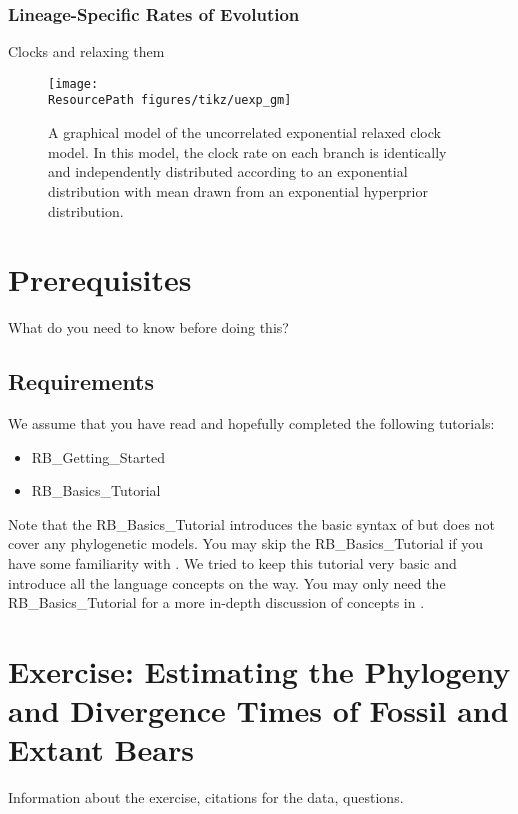 \subsubsection{Lineage-Specific Rates of Evolution}

Clocks \citep{Zuckerkandl1962} and relaxing them 

\begin{figure}[h!]
\centering
\texttt{[image: \\ResourcePath figures/tikz/uexp\_gm]}
\caption{\small A graphical model of the uncorrelated exponential relaxed clock model. In this model, the clock rate on each branch is identically and independently distributed according to an exponential distribution with mean drawn from an exponential hyperprior distribution. }
\label{fig:uexp_gm}
\end{figure}


\section{Prerequisites}

What do you need to know before doing this?

\subsection{Requirements}
We assume that you have read and hopefully completed the following tutorials:
\begin{itemize}
\item RB\_Getting\_Started
\item RB\_Basics\_Tutorial
\end{itemize}
Note that the RB\_Basics\_Tutorial introduces the basic syntax of \Rev but does not cover any phylogenetic models.
You may skip the RB\_Basics\_Tutorial if you have some familiarity with \R.
We tried to keep this tutorial very basic and introduce all the language concepts on the way.
You may only need the RB\_Basics\_Tutorial for a more in-depth discussion of concepts in \Rev.




\section{Exercise: Estimating the Phylogeny and Divergence Times of Fossil and Extant Bears}\label{sect:RB-ExerciseMain}

Information about the exercise, citations for the data, questions. 


